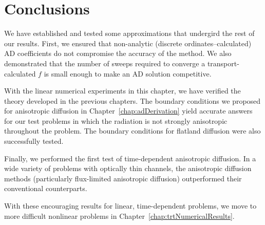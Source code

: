 \section{Conclusions}

We have established and tested some approximations that undergird the rest of
our results.  First, we ensured that non-analytic (discrete
ordinates--calculated) AD coefficients do not compromise the accuracy of the
method. We also demonstrated that the number of sweeps required to converge a
transport-calculated $f$ is small enough to make an AD solution competitive.

With the linear numerical experiments in this chapter, we have verified the
theory developed in the previous chapters. The boundary conditions we proposed
for anisotropic diffusion in Chapter~\ref{chap:adDerivation} yield accurate
answers for our test problems in which the radiation is not strongly anisotropic
throughout the problem. The boundary conditions for flatland diffusion were also
successfully tested.

Finally, we performed the first test of time-dependent anisotropic diffusion. In
a wide variety of problems with optically thin channels, the anisotropic
diffusion methods (particularly flux-limited anisotropic diffusion) outperformed
their conventional counterparts.

With these encouraging results for linear, time-dependent problems, we move to
more difficult nonlinear problems in Chapter~\ref{chap:trtNumericalResults}.

